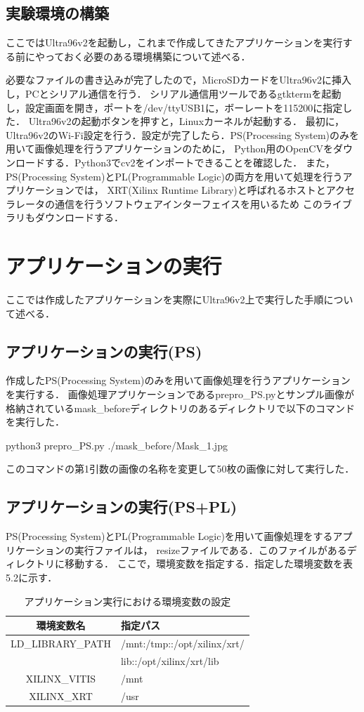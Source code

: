 \documentclass[11pt,a4j]{jreport}
\begin{document}
\subsection{実験環境の構築}
ここではUltra96v2を起動し，これまで作成してきたアプリケーションを実行する前にやっておく必要のある環境構築について述べる．

必要なファイルの書き込みが完了したので，MicroSDカードをUltra96v2に挿入し，PCとシリアル通信を行う．
シリアル通信用ツールであるgtktermを起動し，設定画面を開き，ポートを/dev/ttyUSB1に，ボーレートを115200に指定した．
Ultra96v2の起動ボタンを押すと，Linuxカーネルが起動する．
最初に，Ultra96v2のWi-Fi設定を行う．設定が完了したら．PS(Processing System)のみを用いて画像処理を行うアプリケーションのために，
Python用のOpenCVをダウンロードする．Python3でcv2をインポートできることを確認した．
また，PS(Processing System)とPL(Programmable Logic)の両方を用いて処理を行うアプリケーションでは，
XRT(Xilinx Runtime Library)と呼ばれるホストとアクセラレータの通信を行うソフトウェアインターフェイスを用いるため
このライブラリもダウンロードする．

\section{アプリケーションの実行}
ここでは作成したアプリケーションを実際にUltra96v2上で実行した手順について述べる．
\subsection{アプリケーションの実行(PS)}
作成したPS(Processing System)のみを用いて画像処理を行うアプリケーションを実行する．
画像処理アプリケーションであるprepro_PS.pyとサンプル画像が格納されているmask_beforeディレクトリのあるディレクトリで以下のコマンドを実行した．

python3 prepro_PS.py ./mask_before/Mask_1.jpg

このコマンドの第1引数の画像の名称を変更して50枚の画像に対して実行した．

\subsection{アプリケーションの実行(PS+PL)}
PS(Processing System)とPL(Programmable Logic)を用いて画像処理をするアプリケーションの実行ファイルは，
resizeファイルである．このファイルがあるディレクトリに移動する．
ここで，環境変数を指定する．指定した環境変数を表5.2に示す．
\begin{table}[H]
  \caption{アプリケーション実行における環境変数の設定}
  \centering
  \begin{tabular}{|c|l|}
    \hline
    環境変数名 & 指定パス \\
    \hline \hline
    LD_LIBRARY_PATH & /mnt:/tmp::/opt/xilinx/xrt/ \\
    & lib::/opt/xilinx/xrt/lib \\
    \hline
    XILINX_VITIS & /mnt \\
    \hline
    XILINX_XRT & /usr \\
    \hline
    \end{tabular}
\end{table}
\end{document}
